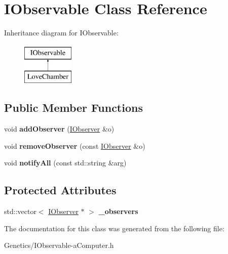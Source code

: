 \hypertarget{class_i_observable}{}\section{I\+Observable Class Reference}
\label{class_i_observable}
Inheritance diagram for I\+Observable\+:\begin{figure}[H]
\begin{center}
\leavevmode
\includegraphics[height=2.000000cm]{class_i_observable}
\end{center}
\end{figure}
\subsection*{Public Member Functions}
\begin{DoxyCompactItemize}
\item 
void {\bfseries add\+Observer} (\hyperlink{struct_i_observer}{I\+Observer} \&o)\hypertarget{class_i_observable_ae94e663b50e3d90c0e05d8909a3ce094}{}\label{class_i_observable_ae94e663b50e3d90c0e05d8909a3ce094}

\item 
void {\bfseries remove\+Observer} (const \hyperlink{struct_i_observer}{I\+Observer} \&o)\hypertarget{class_i_observable_acde21b2c162225ad7b74412209b57fb2}{}\label{class_i_observable_acde21b2c162225ad7b74412209b57fb2}

\item 
void {\bfseries notify\+All} (const std\+::string \&arg)\hypertarget{class_i_observable_ad39b00ebf2d4dc32c570a7ccf00aa62e}{}\label{class_i_observable_ad39b00ebf2d4dc32c570a7ccf00aa62e}

\end{DoxyCompactItemize}
\subsection*{Protected Attributes}
\begin{DoxyCompactItemize}
\item 
std\+::vector$<$ \hyperlink{struct_i_observer}{I\+Observer} $\ast$ $>$ {\bfseries \+\_\+observers}\hypertarget{class_i_observable_a286de222c197aede1ae58c2bac6c4ad2}{}\label{class_i_observable_a286de222c197aede1ae58c2bac6c4ad2}

\end{DoxyCompactItemize}


The documentation for this class was generated from the following file\+:\begin{DoxyCompactItemize}
\item 
Genetics/I\+Observable-\/a\+Computer.\+h\end{DoxyCompactItemize}
